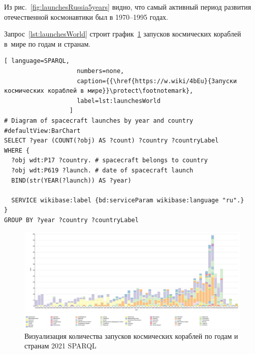 Из рис.~\ref{fig:launchesRussia5years} видно, 
что самый активный период развития отечественной космонавтики был в 1970--1995 годах.

Запрос~\ref{lst:launchesWorld} строит график~\ref{fig:launchesWorld} 
запусков космических кораблей в~мире по годам и странам.

\begin{lstlisting}[ language=SPARQL, 
                    numbers=none, 
                    caption={{\href{https://w.wiki/4bEu}{Запуски космических кораблей в мире}}\protect\footnotemark}, 
                    label=lst:launchesWorld 
                  ]
# Diagram of spacecraft launches by year and country
#defaultView:BarChart
SELECT ?year (COUNT(?obj) AS ?count) ?country ?countryLabel
WHERE {
  ?obj wdt:P17 ?country. # spacecraft belongs to country 
  ?obj wdt:P619 ?launch. # date of spacecraft launch
  BIND(str(YEAR(?launch)) AS ?year)
  
  SERVICE wikibase:label {bd:serviceParam wikibase:language "ru".}
}
GROUP BY ?year ?country ?countryLabel
\end{lstlisting}

\begin{figure}[h!]
  \includegraphics[width=\linewidth]{graphics/chapter/spacecraft_space_station/Visualization of the number of spacecraft launches by year and country 2021.png}
  \caption[График мир]{Визуализация количества запусков космических кораблей по годам и странам 2021 SPARQL}%
  \label{fig:launchesWorld}%
\end{figure}
%

